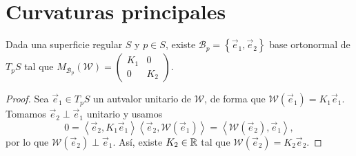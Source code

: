 \section{Curvaturas principales}
\begin{theorem}
	Dada una superficie regular $\displaystyle S $ y $\displaystyle p \in S $, existe $\displaystyle \mathcal{B}_{p}= \left\{ \vec{e}_{1}, \vec{e}_{2}\right\}  $ base ortonormal de $\displaystyle T_{p}S $ tal que $\displaystyle M_{\mathcal{B}_{p}}\left(\mathcal{W}\right)=\begin{pmatrix} K_{1} & 0 \\ 0 & K_{2} \end{pmatrix} $. 
\end{theorem}
\begin{proof}
Sea $\displaystyle \vec{e}_{1}\in T_{p}S $ un autvalor unitario de $\displaystyle \mathcal{W} $, de forma que $\displaystyle \mathcal{W}\left(\vec{e}_{1}\right)=K_{1}\vec{e}_{1} $. Tomamos $\displaystyle \vec{e}_{2}\perp \vec{e}_{1} $ unitario y usamos
\[0 = \left\langle \vec{e}_{2}, K_{1}\vec{e}_{1} \right\rangle \left\langle \vec{e}_{2}, \mathcal{W}\left(\vec{e}_{1}\right) \right\rangle =\left\langle \mathcal{W}\left(\vec{e}_{2}\right), \vec{e}_{1} \right\rangle  ,\]
por lo que $\displaystyle \mathcal{W}\left(\vec{e}_{2}\right)\perp \vec{e}_{1} $. Así, existe $\displaystyle K_{2}\in \mathbb{R} $ tal que $\displaystyle \mathcal{W}\left(\vec{e}_{2}\right)=K_{2}\vec{e}_{2} $. 
\end{proof}

